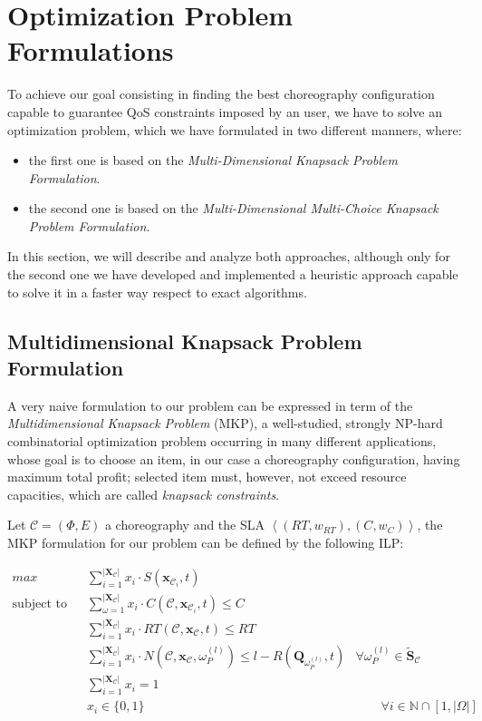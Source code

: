 \documentclass[12pt,a4paper]{report}
\newcommand{\N}{\mathbb{N}}
\begin{document}
\chapter{Optimization Problem Formulations}\label{chapterOptimizationProble}

To achieve our goal consisting in finding the best choreography configuration capable to guarantee QoS constraints imposed by an user, we have to solve an optimization problem, which we have formulated in two  different manners, where:

\begin{itemize}
	\item the first one is based on the \textit{Multi-Dimensional Knapsack Problem Formulation}.
	\item the second one is based on the \textit{Multi-Dimensional Multi-Choice Knapsack Problem Formulation}. 
\end{itemize}

In this section, we will describe and analyze both approaches, although only for the second one we have developed and implemented a heuristic approach capable to solve it in a faster way respect to exact algorithms. 

\section{Multidimensional Knapsack Problem Formulation}

A very naive formulation to our problem can be expressed in term of the \textit{Multidimensional Knapsack Problem} (MKP), a well-studied, strongly NP-hard combinatorial optimization problem occurring in many different applications, whose goal is to choose an item, in our case a choreography configuration, having maximum total profit; selected item must, however, not exceed resource capacities, which are called \textit{knapsack constraints}.

Let $\mathcal{C} = (\Phi,E)$ a choreography and the SLA $\left\langle (RT,w_{RT}),(C,w_{C}) \right\rangle$, the MKP formulation for our problem can be defined by the following ILP:

\begin{align}
\displaystyle max \qquad & \displaystyle \sum_{i = 1}^{|\textbf{X}_{\mathcal{C}}|} x_i \cdot S(\textbf{x}_{\mathcal{C}_i},t) \\
\text{subject to} \qquad & \displaystyle \sum_{\omega = 1}^{|\textbf{X}_{\mathcal{C}}|} x_i \cdot C(\mathcal{C},\textbf{x}_{\mathcal{C}_i}, t) \leq C \\
& \displaystyle \sum_{i = 1}^{|\textbf{X}_{\mathcal{C}}|} x_i \cdot RT(\mathcal{C},\textbf{x}_{\mathcal{C}}, t) \leq RT \\ 
& \displaystyle \sum_{i = 1}^{|\textbf{X}_{\mathcal{C}}|} x_i \cdot N(\mathcal{C},\textbf{x}_{\mathcal{C}}, \omega_{P}^{(l)}) \leq l - R(\textbf{Q}_{\omega_{P}^{(l)}}, t) &  \forall \omega_{P}^{(l)} \in \widetilde{\textbf{S}}_{\mathcal{C}} \\
& \displaystyle \sum_{i = 1}^{|\textbf{X}_{\mathcal{C}}|} x_i = 1 & \\
& x_i \in \lbrace 0, 1 \rbrace & \qquad \forall i \in \N \cap [1,|\Omega|]
\end{align}
\end{document}
